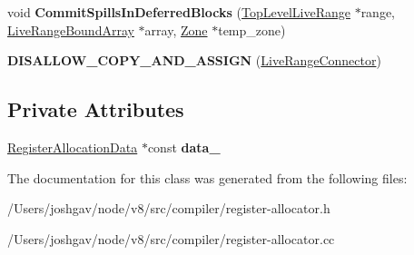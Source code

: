 \begin{DoxyCompactItemize}
\item 
void {\bfseries Commit\+Spills\+In\+Deferred\+Blocks} (\hyperlink{classv8_1_1internal_1_1compiler_1_1_top_level_live_range}{Top\+Level\+Live\+Range} $\ast$range, \hyperlink{classv8_1_1internal_1_1compiler_1_1_live_range_bound_array}{Live\+Range\+Bound\+Array} $\ast$array, \hyperlink{classv8_1_1internal_1_1_zone}{Zone} $\ast$temp\+\_\+zone)\hypertarget{classv8_1_1internal_1_1compiler_1_1_live_range_connector_ae7e07a27c962488ba2ec9cdd57347001}{}\label{classv8_1_1internal_1_1compiler_1_1_live_range_connector_ae7e07a27c962488ba2ec9cdd57347001}

\item 
{\bfseries D\+I\+S\+A\+L\+L\+O\+W\+\_\+\+C\+O\+P\+Y\+\_\+\+A\+N\+D\+\_\+\+A\+S\+S\+I\+GN} (\hyperlink{classv8_1_1internal_1_1compiler_1_1_live_range_connector}{Live\+Range\+Connector})\hypertarget{classv8_1_1internal_1_1compiler_1_1_live_range_connector_afa97b7a7b043b8e1979b3c9614830e86}{}\label{classv8_1_1internal_1_1compiler_1_1_live_range_connector_afa97b7a7b043b8e1979b3c9614830e86}

\end{DoxyCompactItemize}
\subsection*{Private Attributes}
\begin{DoxyCompactItemize}
\item 
\hyperlink{classv8_1_1internal_1_1compiler_1_1_register_allocation_data}{Register\+Allocation\+Data} $\ast$const {\bfseries data\+\_\+}\hypertarget{classv8_1_1internal_1_1compiler_1_1_live_range_connector_a0d4fb72a725e46dd1c56cb0dc01ace2a}{}\label{classv8_1_1internal_1_1compiler_1_1_live_range_connector_a0d4fb72a725e46dd1c56cb0dc01ace2a}

\end{DoxyCompactItemize}


The documentation for this class was generated from the following files\+:\begin{DoxyCompactItemize}
\item 
/\+Users/joshgav/node/v8/src/compiler/register-\/allocator.\+h\item 
/\+Users/joshgav/node/v8/src/compiler/register-\/allocator.\+cc\end{DoxyCompactItemize}
